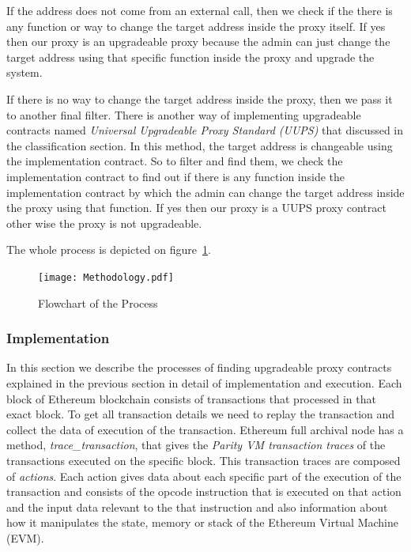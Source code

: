 If the address does not come from an external call, then we check if the there is any function or way to change the target address inside the proxy itself. If yes then our proxy is an upgradeable proxy because the admin can just change the target address using that specific function inside the proxy and upgrade the system.

If there is no way to change the target address inside the proxy, then we pass it to another final filter. There is another way of implementing upgradeable contracts named \textit{Universal Upgradeable Proxy Standard (UUPS)} that discussed in the classification section. In this method, the target address is changeable using the implementation contract. So to filter and find them, we check the implementation contract to find out if there is any function inside the implementation contract by which the admin can change the target address inside the proxy using that function. If yes then our proxy is a UUPS proxy contract other wise the proxy is not upgradeable.

The whole process is depicted on figure~\ref{flowchart}.

\begin{figure}[t!]
  \texttt{[image: Methodology.pdf]}\label{flowchart}
  \caption{Flowchart of the Process}
\end{figure}


\subsubsection{Implementation}\label{findingProxies}
In this section we describe the processes of finding upgradeable proxy contracts explained in the previous section in detail of implementation and execution. 
Each block of Ethereum blockchain consists of transactions that processed in that exact block. To get all transaction details we need to replay the transaction and collect the data of execution of the transaction. Ethereum full archival node has a method, \textit{trace\_transaction}, that gives the \textit{Parity VM transaction traces} of the transactions executed on the specific block. This transaction traces are composed of \textit{actions}. Each action gives data about each specific part of the execution of the transaction and consists of the opcode instruction that is executed on that action and the input data relevant to the that instruction and also information about how it manipulates the state, memory or stack of the Ethereum Virtual Machine (EVM). 

